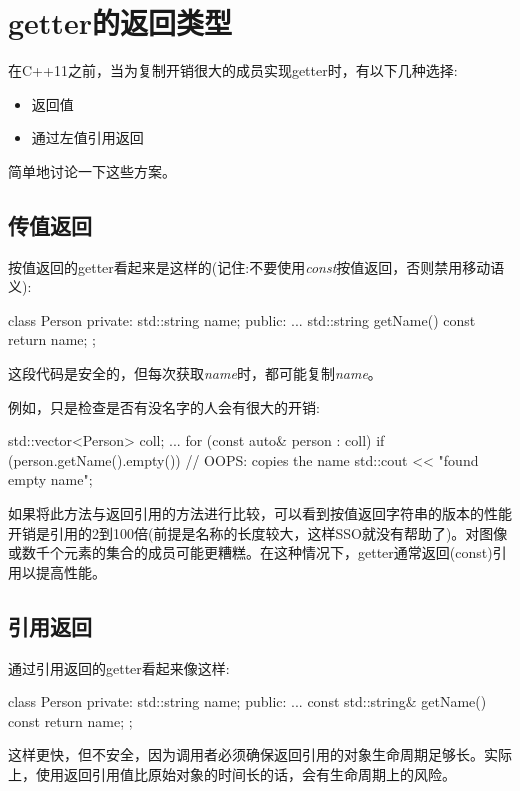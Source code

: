 \section{getter的返回类型}
在C++11之前，当为复制开销很大的成员实现getter时，有以下几种选择:

\begin{itemize}
	\item 返回值
	\item 通过左值引用返回
\end{itemize}

简单地讨论一下这些方案。

\subsection{传值返回}

按值返回的getter看起来是这样的(记住:不要使用\textit{const}按值返回，否则禁用移动语义):

\begin{cppcode}
class Person
{
private:
	std::string name;
public:
	...
	std::string getName() const {
		return name;
	}
};
\end{cppcode}

这段代码是安全的，但每次获取\textit{name}时，都可能复制\textit{name}。

例如，只是检查是否有没名字的人会有很大的开销:

\begin{cppcode}
std::vector<Person> coll;
...
for (const auto& person : coll) {
	if (person.getName().empty()) { // OOPS: copies the name
		std::cout << "found empty name\n";
	}
}
\end{cppcode}

如果将此方法与返回引用的方法进行比较，可以看到按值返回字符串的版本的性能开销是引用的2到100倍(前提是名称的长度较大，这样SSO就没有帮助了)。对图像或数千个元素的集合的成员可能更糟糕。在这种情况下，getter通常返回(const)引用以提高性能。

\subsection{引用返回}

通过引用返回的getter看起来像这样:

\begin{cppcode}
class Person
{
private:
	std::string name;
public:
	...
	const std::string& getName() const {
		return name;
	}
};
\end{cppcode}

这样更快，但不安全，因为调用者必须确保返回引用的对象生命周期足够长。实际上，使用返回引用值比原始对象的时间长的话，会有生命周期上的风险。

